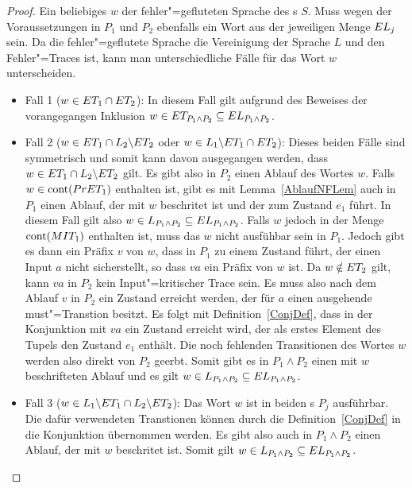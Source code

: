 \begin{proof}
  Ein beliebiges $w$ der fehler"=gefluteten Sprache des \MEIO{}s $S$. Muss
  wegen der Voraussetzungen in $P_1$ und $P_2$ ebenfalls ein Wort aus der
  jeweiligen Menge $EL _j$ sein. Da die fehler"=geflutete Sprache die
  Vereinigung der Sprache $L$ und den Fehler"=Traces \ET{} ist, kann man
  unterschiedliche Fälle für das Wort $w$ unterscheiden.
  \begin{itemize}
    \item Fall 1 ($w\in ET _1\cap ET _2$): In diesem Fall gilt aufgrund des
      Beweises der vorangegangen Inklusion $w\in ET _{P_1\land P_2}\subseteq
      EL _{P_1\land P_2}$.
    \item Fall 2 ($w\in ET _1\cap L_2\backslash ET _2$ oder $w\in
      L_1\backslash ET _1\cap ET _2$): Dieses beiden Fälle sind symmetrisch
      und somit kann \oBdA{} davon ausgegangen werden, dass $w\in ET _1\cap
      L_2\backslash ET _2$ gilt. Es gibt also in $P_2$ einen Ablauf des Wortes
      $w$. Falls $w\in\mathrm{cont} (PrET _1)$ enthalten ist, gibt es mit
      Lemma~\ref{AblaufNFLem} auch in $P_1$ einen Ablauf, der mit $w$
      beschritet ist und der zum Zustand $e_1$ führt. In diesem Fall gilt also
      $w\in L_{P_1\land P_2}\subseteq EL _{P_1\land P_2}$. Falls $w$ jedoch in
      der Menge $\mathrm{cont} (MIT _1)$ enthalten ist, muss das $w$ nicht ausfühbar
      sein in $P_1$. Jedoch gibt es dann ein Präfix $v$ von $w$, dass in $P_1$
      zu einem Zustand führt, der einen Input $a$ nicht sicherstellt, so dass
      $va$ ein Präfix von $w$ ist. Da $w\notin ET _2$ gilt, kann $va$ in $P_2$
      kein Input"=kritischer Trace sein. Es muss also nach dem Ablauf $v$ in
      $P_2$ ein Zustand erreicht werden, der für $a$ einen ausgehende
      must"=Transtion besitzt. Es folgt mit Definition~\ref{ConjDef}, dass in
      der Konjunktion mit $va$ ein Zustand erreicht wird, der als erstes
      Element des Tupels den Zustand $e_1$ enthält. Die noch fehlenden
      Transitionen des Wortes $w$ werden also direkt von $P_2$ geerbt. Somit
      gibt es in $P_1\land P_2$ einen mit $w$ beschrifteten Ablauf und es gilt
      $w\in L_{P_1\land P_2}\subseteq EL _{P_1\land P_2}$.
    \item Fall 3 ($w\in L_1\backslash ET _1 \cap L_2\backslash ET _2$): Das
      Wort $w$ ist in beiden \MEIO{}s $P_j$ ausführbar. Die dafür verwendeten
      Transtionen können durch die Definition~\ref{ConjDef} in die Konjunktion
      übernommen werden. Es gibt also auch in $P_1\land P_2$ einen Ablauf, der
      mit $w$ beschritet ist. Somit gilt $w\in L_{P_1\land P_2}\subseteq EL
      _{P_1\land P_2}$.
  \end{itemize}


\end{proof}

